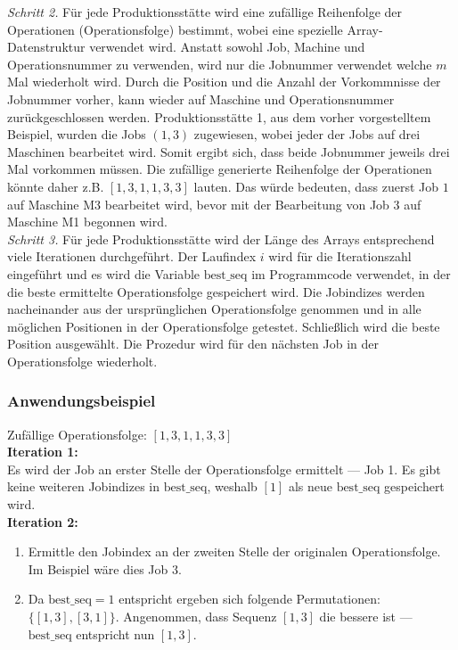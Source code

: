 \documentclass[final, english, ngerman, a4paper, 12pt, %
numbers=noenddot,
cd=true,
cdfont=false,cdfont=nohead,cdfont=nodin,
cdmath=false,
cdhead=false,
cdfoot=true,
cdcover=monochrome,
cdgeometry=symmetric,
declaration=heading,
declaration=notoc,
abstract=heading,
]{tudscrreprt}
\begin{document}
\noindent
\textit{Schritt 2.} Für jede Produktionsstätte wird eine zufällige Reihenfolge der Operationen (Operationsfolge) bestimmt, wobei eine spezielle Array-Datenstruktur verwendet wird. Anstatt sowohl Job, Machine und Operationsnummer zu verwenden, wird nur die Jobnummer verwendet welche $m$ Mal wiederholt wird. Durch die Position und die Anzahl der Vorkommnisse der Jobnummer vorher, kann wieder auf Maschine und Operationsnummer zurückgeschlossen werden. Produktionsstätte 1, aus dem vorher vorgestelltem Beispiel, wurden die Jobs $(1, 3)$ zugewiesen, wobei jeder der Jobs auf drei Maschinen bearbeitet wird. Somit ergibt sich, dass beide Jobnummer jeweils drei Mal vorkommen müssen. Die zufällige generierte Reihenfolge der Operationen könnte daher z.B. $[1,3,1,1,3,3]$ lauten. Das würde bedeuten, dass zuerst Job $1$ auf Maschine M3 bearbeitet wird, bevor mit der Bearbeitung von Job $3$ auf Maschine M1 begonnen wird.\\

\noindent
\textit{Schritt 3.} Für jede Produktionsstätte wird der Länge des Arrays entsprechend viele Iterationen durchgeführt. Der Laufindex $i$ wird für die Iterationszahl eingeführt und es wird die Variable $\text{best\_seq}$ im Programmcode verwendet, in der die beste ermittelte Operationsfolge gespeichert wird. Die Jobindizes werden nacheinander aus der ursprünglichen Operationsfolge genommen und in alle möglichen Positionen in der Operationsfolge getestet. Schließlich wird die beste Position ausgewählt. Die Prozedur wird für den nächsten Job in der Operationsfolge wiederholt.

\subsubsection{Anwendungsbeispiel}
\noindent
Zufällige Operationsfolge: $[1,3,1,1,3,3]$\\

\noindent
\textbf{Iteration 1:}\\
\noindent
Es wird der Job an erster Stelle der Operationsfolge ermittelt — Job 1. Es gibt keine weiteren Jobindizes in $\text{best\_seq}$, weshalb $[1]$ als neue $\text{best\_seq}$ gespeichert wird.\\


\noindent
\textbf{Iteration 2:}
\begin{enumerate}
	\item Ermittle den Jobindex an der zweiten Stelle der originalen Operationsfolge. Im Beispiel wäre dies Job $3$.
	\item Da $\text{best\_seq}= 1$ entspricht ergeben sich folgende Permutationen: $\{ [1,3], [3,1] \}$. Angenommen, dass Sequenz $[1,3]$ die bessere ist — $\text{best\_seq}$ entspricht nun $[1,3]$.
\end{enumerate}
\end{document}
